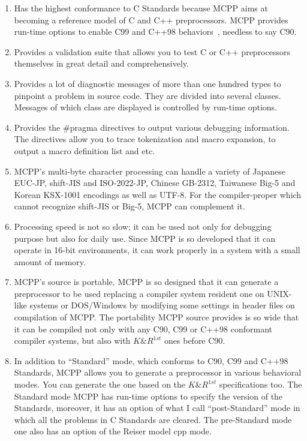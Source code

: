 \documentclass[twocolumn]{article}
\begin{document}
\begin{enumerate}
\item Has the highest conformance to C Standards because MCPP aims at becoming a reference model of C and C++ preprocessors.  MCPP provides run-time options to enable C99 and C++98 behaviors~\cite{C++98}, needless to say C90.

\item Provides a validation suite that allows you to test C or C++ preprocessors themselves in great detail and comprehensively.

\item Provides a lot of diagnostic messages of more than one hundred types to pinpoint a problem in source code.  They are divided into several classes.  Messages of which class are displayed is controlled by run-time options.

\item Provides the \#pragma directives to output various debugging information.  The directives allow you to trace tokenization and macro expansion, to output a macro definition list and etc.

\item MCPP's multi-byte character processing can handle a variety of Japanese EUC-JP, shift-JIS and ISO-2022-JP, Chinese GB-2312, Taiwanese Big-5 and Korean KSX-1001 encodings as well as UTF-8.  For the compiler-proper which cannot recognize shift-JIS or Big-5, MCPP can complement it.

\item Processing speed is not so slow; it can be used not only for debugging purpose but also for daily use.  Since MCPP is so developed that it can operate in 16-bit environments, it can work properly in a system with a small amount of memory.

\item MCPP's source is portable.  MCPP is so designed that it can generate a preprocessor to be used replacing a compiler system resident one on UNIX-like systems or DOS/Windows by modifying some settings in header files on compilation of MCPP\@.  The portability MCPP source provides is so wide that it can be compiled not only with any C90, C99 or C++98 conformant compiler systems, but also with $K\&R^{1st}$ ones before C90.

\item In addition to ``Standard'' mode, which conforms to C90, C99 and C++98 Standards, MCPP allows you to generate a preprocessor in various behavioral modes.  You can generate the one based on the $K\&R^{1st}$ specifications too.  The Standard mode MCPP has run-time options to specify the version of the Standards, moreover, it has an option of what I call ``post-Standard'' mode in which all the problems in C Standards are cleared.  The pre-Standard mode one also has an option of the Reiser model cpp mode.


\end{enumerate}
\end{document}

